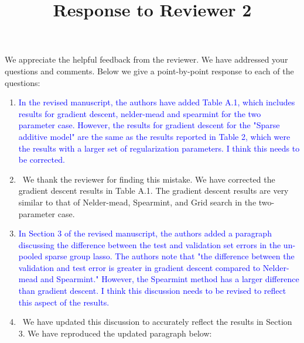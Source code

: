 \documentclass[]{article}
\title{Response to Reviewer 2}
\newcommand{\point}[1]{\item \textcolor{blue}{#1}}
\newcommand{\reply}{\item[]\ }
\begin{document}
	\maketitle
		
	We appreciate the helpful feedback from the reviewer. We have addressed your questions and comments. Below we give a point-by-point response to each of the questions:
		
	\begin{enumerate}
		\point{In the revised manuscript, the authors have added Table A.1, which includes results for gradient descent, nelder-mead and spearmint for the two parameter case.  However, the results for gradient descent for the "Sparse additive model" are the same as the results reported in Table 2, which were the results with a larger set of regularization parameters.  I think this needs to be corrected.}
		
		\reply We thank the reviewer for finding this mistake. We have corrected the gradient descent results in Table A.1. The gradient descent results are very similar to that of Nelder-mead, Spearmint, and Grid search in the two-parameter case.
		
		\point{In Section 3 of the revised manuscript, the authors added a paragraph discussing the difference between the test and validation set errors in the un-pooled sparse group lasso.  The authors note that "the difference between the validation and test error is greater in gradient descent compared to Nelder-mead and Spearmint."  However, the Spearmint method has a larger difference than gradient descent.  I think this discussion needs to be revised to reflect this aspect of the results.}
		
		\reply We have updated this discussion to accurately reflect the results in Section 3. We have reproduced the updated paragraph below:
		

\end{enumerate}
\end{document}
